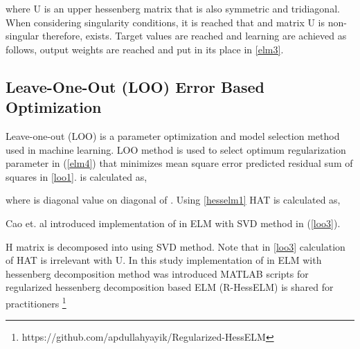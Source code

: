 \documentclass[twocolumn]{svjour3}
\begin{document}
where U is an upper hessenberg matrix that is also symmetric and tridiagonal. When considering singularity conditions, it is reached that  and matrix U is non-singular therefore,  exists. Target values are reached and learning are achieved as follows, output weights are reached and put in its place in \ref{elm3}.

\subsection{Leave-One-Out (LOO) Error Based Optimization}
Leave-one-out (LOO) is a parameter optimization and model selection method used in machine learning. LOO method is used to select optimum regularization parameter  in (\ref{elm4}) that minimizes mean square error predicted residual sum of squares  in \ref{loo1}.  is calculated as,


where  is  diagonal  value on diagonal of . Using \ref{hesselm1} HAT is calculated as,


Cao et. al \cite{ref18} introduced implementation of  in ELM with SVD method in (\ref{loo3}).


   



H matrix is decomposed into  using SVD method. Note that in \ref{loo3} calculation of HAT is irrelevant with U. In this study implementation of  in ELM with hessenberg decomposition method was introduced MATLAB scripts for regularized hessenberg decomposition based ELM (R-HessELM) is shared for practitioners \footnote{https://github.com/apdullahyayik/Regularized-HessELM}
\end{document}
